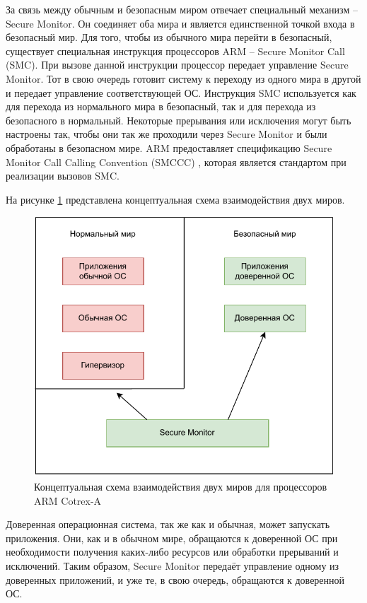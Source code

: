 За связь между обычным и безопасным миром отвечает специальный механизм -- Secure Monitor. Он соединяет оба мира и является единственной точкой входа в безопасный мир. Для того, чтобы из обычного мира перейти в безопасный, существует специальная инструкция процессоров ARM -- Secure Monitor Call (SMC). При вызове данной инструкции процессор передает управление Secure Monitor. Тот в свою очередь готовит систему к переходу из одного мира в другой и передает управление соответствующей ОС. Инструкция SMC используется как для перехода из нормального мира в безопасный, так и для перехода из безопасного в нормальный. Некоторые прерывания или исключения могут быть настроены так, чтобы они так же проходили через Secure Monitor и были обработаны в безопасном мире. ARM предоставляет спецификацию Secure Monitor Call Calling Convention (SMCCC) \cite{smccc}, которая является стандартом при реализации вызовов SMC. 

На рисунке \ref{fig:trustzone-conceptual} представлена концептуальная схема взаимодействия двух миров.

\begin{figure}[h]
	\centering
	\includegraphics[width=\textwidth]{img/arm-conceptual.pdf}
	\caption{Концептуальная схема взаимодействия двух миров для процессоров ARM Cotrex-A}
	\label{fig:trustzone-conceptual}
\end{figure}

Доверенная операционная система, так же как и обычная, может запускать приложения. Они, как и в обычном мире, обращаются к доверенной ОС при необходимости получения каких-либо ресурсов или обработки прерываний и исключений. Таким образом, Secure Monitor передаёт управление одному из доверенных приложений, и уже те, в свою очередь, обращаются к доверенной ОС.

